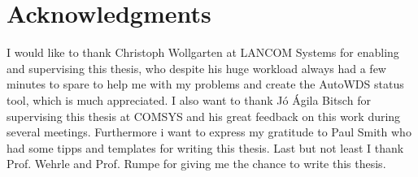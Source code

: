 \cleardoublepage

\chapter*{Acknowledgments}

I would like to thank Christoph Wollgarten at LANCOM Systems for enabling and supervising this thesis, who despite his huge workload always had a few minutes to spare
to help me with my problems and create the AutoWDS status tool, which is much appreciated.
I also want to thank J\'o \'Agila Bitsch for supervising this thesis at COMSYS and his great feedback on this work during several meetings.
Furthermore i want to express my gratitude to Paul Smith who had some tipps and templates for writing this thesis.
Last but not least I thank Prof. Wehrle and Prof. Rumpe for giving me the chance to write this thesis.